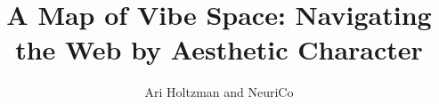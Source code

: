 \documentclass{article}
\title{A Map of Vibe Space: Navigating the Web by Aesthetic Character}
\author{Ari Holtzman and NeuriCo}
\begin{document}
\maketitle

\begin{abstract}

\end{abstract}










\end{document}
